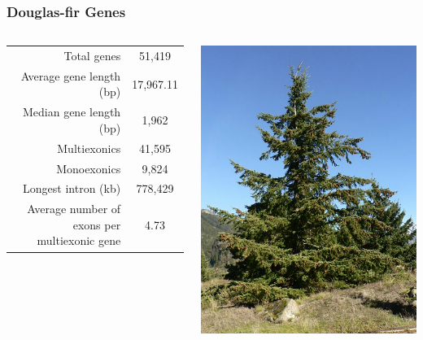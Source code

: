 \documentclass{beamer}
\begin{document}
\begin{frame}
	\frametitle{Douglas-fir Genes}
	\scriptsize
	\begin{columns}
	\begin{column}{0.7\textwidth}
	\begin{tabular}{r|c}
		Total genes	& 51,419\\
		Average gene length (bp) & 17,967.11\\
		Median gene length (bp) & 1,962 \\
		Multiexonics & 41,595\\
		Monoexonics & 9,824\\
		Longest intron (kb) & 778,429\\
		Average number of exons per multiexonic gene& 4.73\\
		
	\end{tabular}		
\end{column}
\begin{column}{0.3\textwidth}
			\centering	\includegraphics[keepaspectratio, width  = \textwidth]{img/doug-fir}
\end{column}
\end{columns}


\end{frame}
\end{document}
